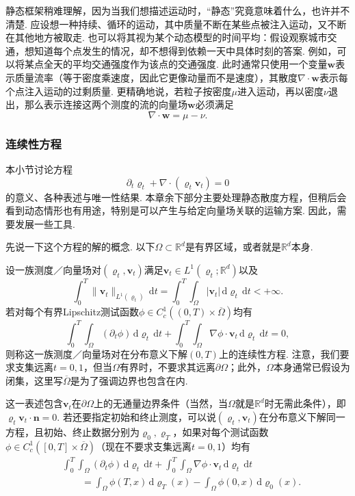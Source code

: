 静态框架稍难理解，因为当我们想描述运动时，“静态”究竟意味着什么，也许并不清楚. 应设想一种持续、循环的运动，其中质量不断在某些点被注入运动，又不断在其他地方被取走. 也可以将其视为某个动态模型的时间平均：假设观察城市交通，想知道每个点发生的情况，却不想得到依赖一天中具体时刻的答案. 例如，可以将某点全天的平均交通强度作为该点的交通强度. 此时通常只使用一个变量$\mathbf w$表示质量流率（等于密度乘速度，因此它更像动量而不是速度），其散度$\nabla\cdot\mathbf w$表示每个点注入运动的过剩质量. 更精确地说，若粒子按密度$\mu$进入运动，再以密度$\nu$退出，那么表示连接这两个测度的流的向量场$\mathbf w$必须满足
\[
 \nabla\cdot\mathbf w=\mu-\nu.
\]

\subsubsection{连续性方程}\label{sec:4.1.2}

本小节讨论方程
\[
 \partial_t\varrho_t+\nabla\cdot(\varrho_t\mathbf v_t)=0
\]
的意义、各种表述与唯一性结果. 本章余下部分主要处理静态散度方程，但稍后会看到动态情形也有用途，特别是可以产生与给定向量场关联的运输方案. 因此，需要发展一些工具.

先说一下这个方程的解的概念. 以下$\Omega\subset\mathbb R^d$是有界区域，或者就是$\mathbb R^d$本身.

\begin{definition}\label{obj:4.1}
设一族测度／向量场对$(\varrho_t,\mathbf v_t)$满足$\mathbf v_t\in L^1(\varrho_t;\mathbb R^d)$以及
\[
 \int_0^T\|\mathbf v_t\|_{L^1(\varrho_t)}\,\mathrm dt
 =\int_0^T\int_\Omega|\mathbf v_t|\,\mathrm d\varrho_t\,\mathrm dt<+\infty.
\]
若对每个有界Lipschitz测试函数$\phi\in C_c^1((0,T)\times\overline\Omega)$均有
\begin{equation}\label{eq:4.2}
 \int_0^T\int_\Omega(\partial_t\phi)\,\mathrm d\varrho_t\,\mathrm dt
 +\int_0^T\int_\Omega\nabla\phi\cdot\mathbf v_t\,\mathrm d\varrho_t\,\mathrm dt=0,
\end{equation}
则称这一族测度／向量场对在分布意义下解$(0,T)$上的连续性方程. 注意，我们要求支集远离$t=0,1$，但当$\Omega$有界时，不要求其远离$\partial\Omega$；此外，$\Omega$本身通常已假设为闭集，这里写$\overline\Omega$是为了强调边界也包含在内.
\end{definition}

\label{idx:root4-p123-neumann}这一表述包含$\mathbf v_t$在$\partial\Omega$上的无通量边界条件（当然，当$\Omega$就是$\mathbb R^d$时无需此条件），即$\varrho_t\mathbf v_t\cdot\mathbf n=0$. 若还要指定初始和终止测度，可以说$(\varrho_t,\mathbf v_t)$在分布意义下解同一方程，且初始、终止数据分别为$\varrho_0,\varrho_T$，如果对每个测试函数$\phi\in C_c^1([0,T]\times\overline\Omega)$（现在不要求支集远离$t=0,1$）均有
\begin{equation}\label{eq:4.3}
\begin{aligned}
 &\int_0^T\int_\Omega(\partial_t\phi)\,\mathrm d\varrho_t\,\mathrm dt
 +\int_0^T\int_\Omega\nabla\phi\cdot\mathbf v_t\,\mathrm d\varrho_t\,\mathrm dt\\
 &\qquad=\int_\Omega\phi(T,x)\,\mathrm d\varrho_T(x)
              -\int_\Omega\phi(0,x)\,\mathrm d\varrho_0(x).
\end{aligned}
\end{equation}

